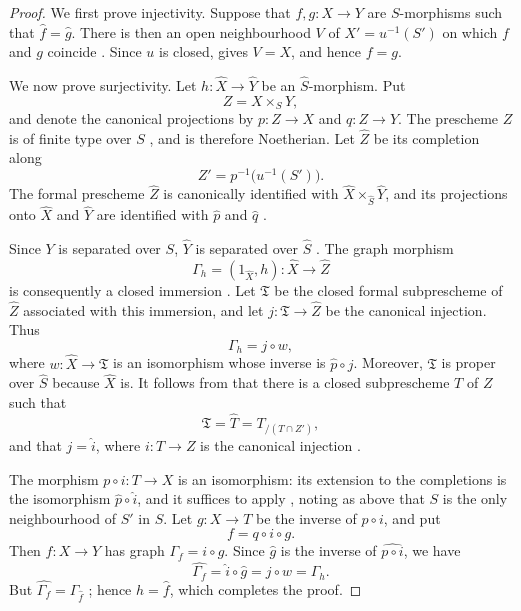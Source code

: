 \begin{proof}
We first prove injectivity.  Suppose that $f,g:X\to Y$ are
$S$-morphisms such that $\widehat{f}=\widehat{g}$.  There is then
an open neighbourhood $V$ of $X'=u^{-1}(S')$ on which $f$ and $g$
coincide .  Since $u$ is closed,
 gives $V=X$, and hence $f=g$.

We now prove surjectivity.  Let
$h:\widehat{X}\to\widehat{Y}$ be an
$\widehat{S}$-morphism.  Put
\[
  Z=X\times_S Y,
\]
and denote the canonical projections by $p:Z\to X$ and
$q:Z\to Y$.  The prescheme $Z$ is of finite type over $S$
, and is therefore Noetherian.  Let
$\widehat{Z}$ be its completion along
\[
  Z'=p^{-1}\bigl(u^{-1}(S')\bigr).
\]
The formal prescheme $\widehat{Z}$ is canonically identified with
$\widehat{X}\times_{\widehat{S}}\widehat{Y}$, and its projections
onto $\widehat{X}$ and $\widehat{Y}$ are identified with
$\widehat{p}$ and $\widehat{q}$ .

Since $Y$ is separated over $S$, $\widehat{Y}$ is separated over
$\widehat{S}$ .  The graph morphism
\[
  \Gamma_h=(1_{\widehat{X}},h):
  \widehat{X}\longrightarrow\widehat{Z}
\]
is consequently a closed immersion .  Let
$\mathfrak{T}$ be the closed formal subprescheme of
$\widehat{Z}$ associated with this immersion, and let
$j:\mathfrak{T}\to\widehat{Z}$ be the canonical injection.  Thus
\[
  \Gamma_h=j\circ w,
\]
where $w:\widehat{X}\to\mathfrak{T}$ is an isomorphism
 whose inverse is
$\widehat{p}\circ j$.  Moreover, $\mathfrak{T}$ is proper over
$\widehat{S}$ because $\widehat{X}$ is.  It follows from
 that there is a closed subprescheme $T$ of $Z$
such that
\[
  \mathfrak{T}
  =\widehat{T}
  =T_{/(T\cap Z')},
\]
and that $j=\widehat{i}$, where $i:T\to Z$ is the canonical
injection .

The morphism $p\circ i:T\to X$ is an isomorphism: its extension to
the completions is the isomorphism
$\widehat{p}\circ\widehat{i}$, and it suffices to apply
, noting as above that $S$ is the only
neighbourhood of $S'$ in $S$.
Let $g:X\to T$ be the inverse of $p\circ i$, and put
\[
  f=q\circ i\circ g.
\]
Then $f:X\to Y$ has graph $\Gamma_f=i\circ g$.  Since
$\widehat{g}$ is the inverse of
$\widehat{p\circ i}$, we have
\[
  \widehat{\Gamma_f}
  =\widehat{i}\circ\widehat{g}
  =j\circ w
  =\Gamma_h.
\]
But $\widehat{\Gamma_f}=\Gamma_{\widehat{f}}$
; hence $h=\widehat{f}$, which completes the
proof.
\end{proof}

